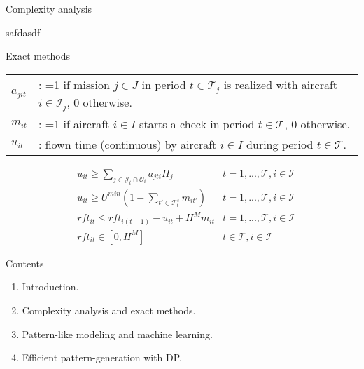 \section{\firsttitle}

\begin{frame}

\begin{block}{Complexity analysis}

safdasdf

\end{block}

\end{frame}

\begin{frame}

\begin{block}{Exact methods}

\begin{tabular}{p{15mm}p{110mm}}
  $a_{jit}$ &  :  =1 if mission $j \in J$ in period $t \in \mathcal{T}_j$ is realized with aircraft $i \in \mathcal{I}_j$, 0 otherwise.  \\
  $m_{it}$   & :  =1 if aircraft $i \in I$ starts a check in period $t \in \mathcal{T}$, 0 otherwise.  \\
  $u_{it}$    &:  flown time (continuous) by aircraft $i \in I$ during period $t \in \mathcal{T}$. \\
\end{tabular}

\begin{align}
 & u_{it} \geq \sum_{j \in \mathcal{J}_t \cap \mathcal{O}_i} a_{jti} H_j 
    & t =1, ..., \mathcal{T}, i \in \mathcal{I} \label{eq:flight1}\\
 & u_{it} \geq U^{min} (1 - \sum_{t' \in \mathcal{T}^s_t} m_{it'})
    & t =1, ..., \mathcal{T}, i \in \mathcal{I} \label{eq:flight2}\\
 & rft_{it} \leq rft_{i(t-1)} - u_{it} + H^M m_{it}
    & t =1, ..., \mathcal{T}, i \in \mathcal{I} \label{eq:first_rft_upper}\\
& rft_{it} \in [0,H^M]
      & t \in \mathcal{T}, i \in \mathcal{I} \label{eq:first-mu}
\end{align}

\end{block}

\begin{block}{Contents}

\begin{enumerate}[<+->]

\item
  Introduction.
\item
  Complexity analysis and exact methods.
\item
  Pattern-like modeling and machine learning.
\item
  Efficient pattern-generation with DP.
\end{enumerate}

\end{block}

\end{frame}